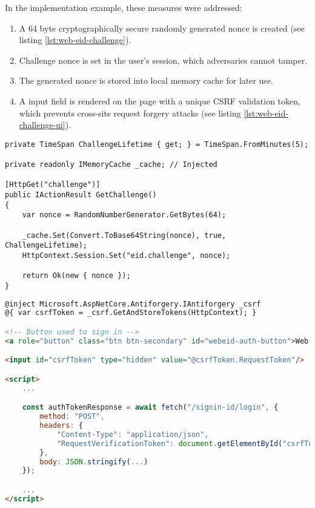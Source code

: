 In the implementation example, these measures were addressed:
\begin{enumerate}
  \item A 64 byte cryptographically secure randomly generated nonce is created (see listing \ref{lst:web-eid-challenge}).
  \item Challenge nonce is set in the user's session, which adversaries cannot tamper.
  \item The generated nonce is stored into local memory cache for later use.
  \item A input field is rendered on the page with a unique CSRF validation token, which prevents cross-site request forgery attacks (see listing \ref{lst:web-eid-challenge-ui}).
\end{enumerate}

\begin{lstlisting}[caption={Web eID Challenge Endpoint}, label={lst:web-eid-challenge}]
private TimeSpan ChallengeLifetime { get; } = TimeSpan.FromMinutes(5);

private readonly IMemoryCache _cache; // Injected

[HttpGet("challenge")]
public IActionResult GetChallenge()
{
    var nonce = RandomNumberGenerator.GetBytes(64);

    _cache.Set(Convert.ToBase64String(nonce), true, ChallengeLifetime);
    HttpContext.Session.Set("eid.challenge", nonce);

    return Ok(new { nonce });
}
\end{lstlisting}


\begin{lstlisting}[caption={Web eID UI excerpt}, label={lst:web-eid-challenge-ui}, language={html}]
@inject Microsoft.AspNetCore.Antiforgery.IAntiforgery _csrf
@{ var csrfToken = _csrf.GetAndStoreTokens(HttpContext); }

<!-- Button used to sign in -->
<a role="button" class="btn btn-secondary" id="webeid-auth-button">Web eID</a>

<input id="csrfToken" type="hidden" value="@csrfToken.RequestToken"/>

<script>
    ...

    const authTokenResponse = await fetch("/signin-id/login", {
        method: "POST",
        headers: {
            "Content-Type": "application/json",
            "RequestVerificationToken": document.getElementById("csrfToken").value
        },
        body: JSON.stringify(...)
    });

    ...
</script>
\end{lstlisting}

